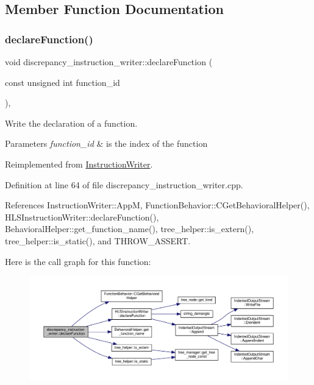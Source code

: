 \subsection{Member Function Documentation}
\mbox{\label{classdiscrepancy__instruction__writer_a7cdc4c4bb3fd4ce16b91ca818271d2b8}} 
\subsubsection{\texorpdfstring{declare\+Function()}{declareFunction()}}
{\footnotesize\ttfamily void discrepancy\+\_\+instruction\+\_\+writer\+::declare\+Function (\begin{DoxyParamCaption}\item[{const unsigned int}]{function\+\_\+id }\end{DoxyParamCaption})\hspace{0.3cm}{\ttfamily [override]}, {\ttfamily [virtual]}}



Write the declaration of a function. 


\begin{DoxyParams}{Parameters}
{\em function\+\_\+id} & is the index of the function \\
\hline
\end{DoxyParams}


Reimplemented from \hyperlink{classInstructionWriter_adb886a6fe469c8b1142c63ee31c4a2f1}{Instruction\+Writer}.



Definition at line 64 of file discrepancy\+\_\+instruction\+\_\+writer.\+cpp.



References Instruction\+Writer\+::\+AppM, Function\+Behavior\+::\+C\+Get\+Behavioral\+Helper(), H\+L\+S\+Instruction\+Writer\+::declare\+Function(), Behavioral\+Helper\+::get\+\_\+function\+\_\+name(), tree\+\_\+helper\+::is\+\_\+extern(), tree\+\_\+helper\+::is\+\_\+static(), and T\+H\+R\+O\+W\+\_\+\+A\+S\+S\+E\+RT.

Here is the call graph for this function\+:
\nopagebreak
\begin{figure}[H]
\begin{center}
\leavevmode
\includegraphics[width=350pt]{d1/d3c/classdiscrepancy__instruction__writer_a7cdc4c4bb3fd4ce16b91ca818271d2b8_cgraph}
\end{center}
\end{figure}


